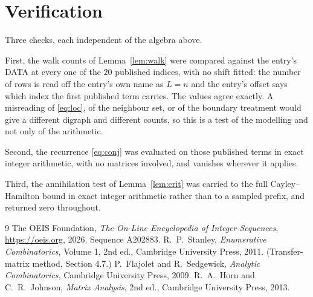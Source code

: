\documentclass[11pt,a4paper]{article}
\theoremstyle{plain}
\theoremstyle{definition}
\begin{document}
\section{Verification}

Three checks, each independent of the algebra above.

First, the walk counts of Lemma~\ref{lem:walk} were compared against the entry's DATA at
every one of the $20$ published indices, with no shift fitted: the number of rows is
read off the entry's own name as $L=n$ and the entry's offset says which index the first
published term carries. The values agree exactly. A misreading of \eqref{eq:loc}, of the
neighbour set, or of the boundary treatment would give a different digraph and different
counts, so this is a test of the modelling and not only of the arithmetic.

Second, the recurrence \eqref{eq:conj} was evaluated on those published terms in exact
integer arithmetic, with no matrices involved, and vanishes wherever it applies.

Third, the annihilation test of Lemma~\ref{lem:crit} was carried to the full
Cayley--Hamilton bound in exact integer arithmetic rather than to a sampled prefix, and
returned zero throughout.

\begin{thebibliography}{9}
 The OEIS Foundation, \emph{The On-Line Encyclopedia of Integer
Sequences}, \url{https://oeis.org}, 2026. Sequence A202883.
 R.~P.~Stanley, \emph{Enumerative Combinatorics}, Volume 1, 2nd ed.,
Cambridge University Press, 2011. (Transfer-matrix method, Section 4.7.)
 P.~Flajolet and R.~Sedgewick, \emph{Analytic Combinatorics}, Cambridge
University Press, 2009.
 R.~A.~Horn and C.~R.~Johnson, \emph{Matrix Analysis}, 2nd ed., Cambridge
University Press, 2013.
\end{thebibliography}
\end{document}
